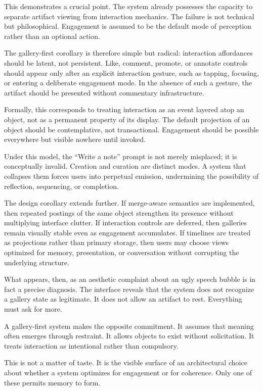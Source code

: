 \documentclass[11pt,oneside]{article}
\begin{document}
This demonstrates a crucial point. The system already possesses the capacity to separate artifact viewing from interaction mechanics. The failure is not technical but philosophical. Engagement is assumed to be the default mode of perception rather than an optional action.

The gallery-first corollary is therefore simple but radical: interaction affordances should be latent, not persistent. Like, comment, promote, or annotate controls should appear only after an explicit interaction gesture, such as tapping, focusing, or entering a deliberate engagement mode. In the absence of such a gesture, the artifact should be presented without commentary infrastructure.

Formally, this corresponds to treating interaction as an event layered atop an object, not as a permanent property of its display. The default projection of an object should be contemplative, not transactional. Engagement should be possible everywhere but visible nowhere until invoked.

Under this model, the “Write a note” prompt is not merely misplaced; it is conceptually invalid. Creation and curation are distinct modes. A system that collapses them forces users into perpetual emission, undermining the possibility of reflection, sequencing, or completion.

The design corollary extends further. If merge-aware semantics are implemented, then repeated postings of the same object strengthen its presence without multiplying interface clutter. If interaction controls are deferred, then galleries remain visually stable even as engagement accumulates. If timelines are treated as projections rather than primary storage, then users may choose views optimized for memory, presentation, or conversation without corrupting the underlying structure.

What appears, then, as an aesthetic complaint about an ugly speech bubble is in fact a precise diagnosis. The interface reveals that the system does not recognize a gallery state as legitimate. It does not allow an artifact to rest. Everything must ask for more.

A gallery-first system makes the opposite commitment. It assumes that meaning often emerges through restraint. It allows objects to exist without solicitation. It treats interaction as intentional rather than compulsory.

This is not a matter of taste. It is the visible surface of an architectural choice about whether a system optimizes for engagement or for coherence. Only one of these permits memory to form.
\end{document}
